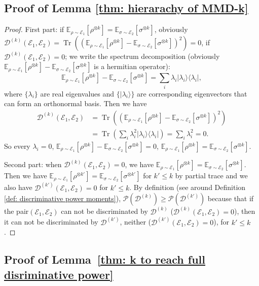 \documentclass[aps,prx,reprint,superscriptaddress,amsmath,amssymb,longbibliography,floatfix]{revtex4-2}
\providecommand{\ket}[1]{|#1 \rangle}
\providecommand{\ketbra}[2]{|#1\rangle \langle #2|}
\newcommand{\dsE}{\mathbb{E}}
\newcommand{\scD}{\mathcal{D}}
\newcommand{\scE}{\mathcal{E}}
\newcommand{\scP}{\mathcal{P}}
\newcommand{\Tr}{\operatorname{Tr}}
\theoremstyle{plain}
\theoremstyle{definition}
\theoremstyle{remark}
\begin{document}
\subsection{Proof of Lemma \ref{thm: hierarachy of MMD-k}}
\begin{proof}
    First part:
    if $\dsE_{\rho\sim\scE_1}[\rho^{\otimes k}] = \dsE_{\sigma\sim\scE_2}[\sigma^{\otimes k}]$, obviously $\scD^{(k)}(\scE_1, \scE_2) = \Tr((\dsE_{\rho\sim\scE_1}[\rho^{\otimes k}]- \dsE_{\sigma\sim\scE_2}[\sigma^{\otimes k}])^2)=0$, if $\scD^{(k)}(\scE_1, \scE_2) =0$; we write the spectrum decomposition (obviously $\dsE_{\rho\sim\scE_1}[\rho^{\otimes k}]- \dsE_{\sigma\sim\scE_2}[\sigma^{\otimes k}]$ is a hermitian operator):
    \begin{equation*}
        \dsE_{\rho\sim\scE_1}[\rho^{\otimes k}]- \dsE_{\sigma\sim\scE_2}[\sigma^{\otimes k}] = \sum_i\lambda_i\ketbra{\lambda_i}{\lambda_i},
    \end{equation*}
    where $\{\lambda_i\}$ are real eigenvalues and $\{\ket{\lambda_i}\}$ are corresponding eigenvectors that can form an orthonormal basis. Then we have
    \begin{align*}
        \scD^{(k)}(\scE_1, \scE_2)
        &=\Tr((\dsE_{\rho\sim\scE_1}[\rho^{\otimes k}]- \dsE_{\sigma\sim\scE_2}[\sigma^{\otimes k}])^2)\\
        &=\Tr(\sum_i\lambda_i^2\ketbra{\lambda_i}{\lambda_i})=\sum_i\lambda_i^2=0.
    \end{align*}
    So every $\lambda_i=0$, $\dsE_{\rho\sim\scE_1}[\rho^{\otimes k}]- \dsE_{\sigma\sim\scE_2}[\sigma^{\otimes k}]=0$, $\dsE_{\rho\sim\scE_1}[\rho^{\otimes k}]=\dsE_{\sigma\sim\scE_2}[\sigma^{\otimes k}]$.

    Second part: when $\scD^{(k)}(\scE_1, \scE_2)=0$, we have $\dsE_{\rho\sim\scE_1}[\rho^{\otimes k}]=\dsE_{\sigma\sim\scE_2}[\sigma^{\otimes k}]$. Then we have $\dsE_{\rho\sim\scE_1}[\rho^{\otimes k'}]=\dsE_{\sigma\sim\scE_2}[\sigma^{\otimes k'}]$ for $k'\le k$ by partial trace and  we also have $\scD^{(k')}(\scE_1, \scE_2)=0$ for $k'\le k$. By definition (see around Definition \ref{def: discriminative power moments}), $\scP(\scD^{(k)})\ge\scP(\scD^{(k')})$ because that if the pair$(\scE_1,\scE_2)$ can not be discriminated by $\scD^{(k)}$ ($\scD^{(k)}(\scE_1, \scE_2)=0$), then it can not be discriminated by $\scD^{(k')}$, neither ($\scD^{(k')}(\scE_1, \scE_2)=0$), for $k'\le k$.
\end{proof}

\subsection{Proof of Lemma~\ref{thm: k to reach full disriminative power}}
\end{document}
